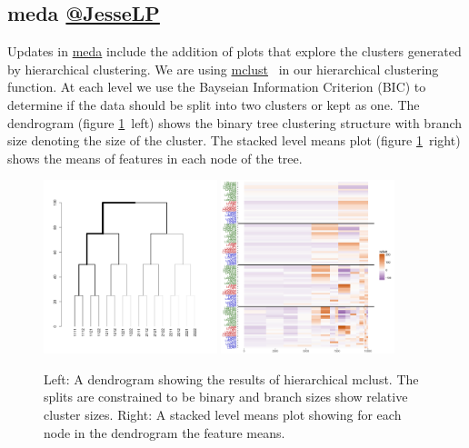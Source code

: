 \documentclass[simplex.tex]{subfiles}
\begin{document}
\subsection[meda]{meda \href{https://github.com/mrae}{@JesseLP}}

Updates in \href{https://github.com/neurodata/meda}{meda} include the
addition of plots that explore the clusters generated by
hierarchical clustering.  We are using 
\href{http://www.stat.washington.edu/fraley/mclust/}{mclust}~  
in our
hierarchical clustering function.  At each level we use the Bayseian
Information Criterion (BIC) to determine if the data should be split
into two clusters or kept as one.  The dendrogram 
(figure \ref{fig:meda}~left)
shows the binary tree clustering structure with branch size denoting the
size of the cluster.  The stacked level means plot
(figure \ref{fig:meda}~right) shows the means of features in each node 
of the tree.


\begin{figure}[!h]
\begin{cframed}
\centering
\includegraphics[width=0.45\textwidth, clip = true, trim = 2cm 5cm 4cm 6cm ]{../../figs/K15_samp1e4_01e3_dendro.png}
\includegraphics[width=0.45\textwidth, clip = true, trim = 1cm 0 5mm 1mm]{../../figs/K15_samp1e4_01e3_slcmeans.png}
\caption{Left:  A dendrogram showing the results of hierarchical mclust.
The splits are constrained to be binary and branch sizes show relative
cluster sizes.  Right: A stacked level means plot showing for each node
in the dendrogram the feature means.}
\label{fig:meda}
\end{cframed}
\end{figure}

\clearpage
\end{document}
